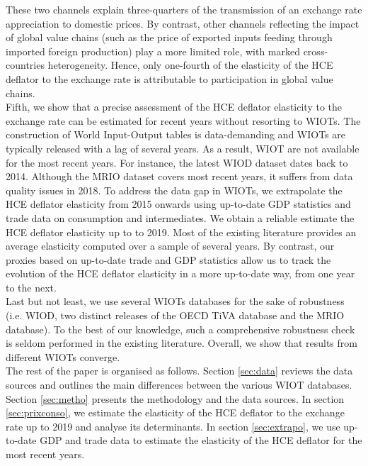 \documentclass[11pt,a4paper]{paper} %
\begin{document}
These two channels explain three-quarters of the transmission of an exchange rate appreciation to domestic prices.
By contrast, other channels reflecting the impact of global value chains (such as the price of exported inputs feeding through imported foreign production) play a more limited role, with marked cross-countries heterogeneity.
Hence, only one-fourth of the elasticity of the HCE deflator to the exchange rate is attributable to participation in global value chains.\\
Fifth, we show that a precise assessment of the HCE deflator elasticity to the exchange rate can be estimated for recent years without resorting to WIOTs. 
The construction of World Input-Output tables is data-demanding and WIOTs are typically released with a lag of several years.
As a result, WIOT are not available for the most recent years. For instance, the latest WIOD dataset dates back to 2014. 
Although the MRIO dataset covers most recent years, it suffers from data quality issues in 2018. 
To address the data gap in WIOTs, we extrapolate the HCE deflator elasticity from 2015 onwards using up-to-date GDP statistics and trade data on consumption and intermediates.
We obtain a reliable estimate the HCE deflator elasticity up to to 2019.
Most of the existing literature provides an average elasticity computed over a sample of several years. 
By contrast, our proxies based on up-to-date trade and GDP statistics allow us to track the evolution of the HCE deflator elasticity in a more up-to-date way, from one year to the next. \\
Last but not least, we use several WIOTs databases for the sake of robustness (i.e. WIOD, two distinct releases of the OECD TiVA database and the MRIO database). 
To the best of our knowledge, such a comprehensive robustness check is seldom performed in the existing literature.
Overall, we show that results from different WIOTs converge. \\
The rest of the paper is organised as follows.
Section \ref{sec:data} reviews the data sources and outlines the main differences between the various WIOT databases.
Section \ref{sec:metho} presents the methodology and the data sources.
In section \ref{sec:prixconso}, we estimate the elasticity of the HCE deflator to the exchange rate up to 2019 and analyse its determinants.
In section \ref{sec:extrapo}, we use up-to-date GDP and trade data to estimate the elasticity of the HCE deflator for the most recent years.
\end{document}
